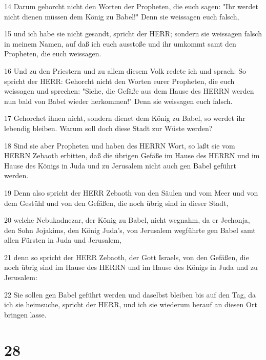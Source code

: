 \par 14 Darum gehorcht nicht den Worten der Propheten, die euch sagen: "Ihr werdet nicht dienen müssen dem König zu Babel!" Denn sie weissagen euch falsch,
\par 15 und ich habe sie nicht gesandt, spricht der HERR; sondern sie weissagen falsch in meinem Namen, auf daß ich euch ausstoße und ihr umkommt samt den Propheten, die euch weissagen.
\par 16 Und zu den Priestern und zu allem diesem Volk redete ich und sprach: So spricht der HERR: Gehorcht nicht den Worten eurer Propheten, die euch weissagen und sprechen: "Siehe, die Gefäße aus dem Hause des HERRN werden nun bald von Babel wieder herkommen!" Denn sie weissagen euch falsch.
\par 17 Gehorchet ihnen nicht, sondern dienet dem König zu Babel, so werdet ihr lebendig bleiben. Warum soll doch diese Stadt zur Wüste werden?
\par 18 Sind sie aber Propheten und haben des HERRN Wort, so laßt sie vom HERRN Zebaoth erbitten, daß die übrigen Gefäße im Hause des HERRN und im Hause des Königs in Juda und zu Jerusalem nicht auch gen Babel geführt werden.
\par 19 Denn also spricht der HERR Zebaoth von den Säulen und vom Meer und von dem Gestühl und von den Gefäßen, die noch übrig sind in dieser Stadt,
\par 20 welche Nebukadnezar, der König zu Babel, nicht wegnahm, da er Jechonja, den Sohn Jojakims, den König Juda's, von Jerusalem wegführte gen Babel samt allen Fürsten in Juda und Jerusalem,
\par 21 denn so spricht der HERR Zebaoth, der Gott Israels, von den Gefäßen, die noch übrig sind im Hause des HERRN und im Hause des Königs in Juda und zu Jerusalem:
\par 22 Sie sollen gen Babel geführt werden und daselbst bleiben bis auf den Tag, da ich sie heimsuche, spricht der HERR, und ich sie wiederum herauf an diesen Ort bringen lasse.

\chapter{28}

